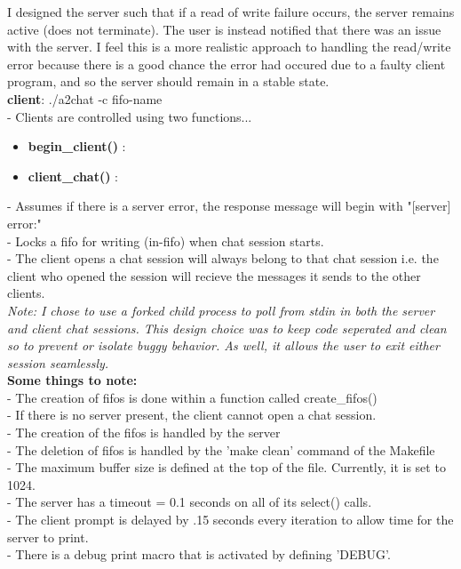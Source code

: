 \documentclass{article}
\begin{document}
\noindent
I designed the server such that if a read of write failure
occurs, the server remains active (does not terminate).
The user is instead notified that there was an issue with
the server. I feel this is a more realistic approach to
handling the read/write error because there is a good
chance the error had occured due to a faulty client
program, and so the server should remain in a stable state. \\

\noindent
\textbf{client}: ./a2chat -c fifo-name \\
- Clients are controlled using two functions...

\begin{itemize}
  \item \textbf{ begin\_client() }:
  \item \textbf{ client\_chat() }:
\end{itemize}

\noindent
- Assumes if there is a server error, the response
message will begin with "[server] error:"\\
- Locks a fifo for writing (in-fifo) when chat session
starts. \\
- The client opens a chat session will always
belong to that chat session i.e. the client
who opened the session will recieve the messages
it sends to the other clients. \\

\noindent
\textit{Note: I chose to use a forked child process to poll
from stdin in both the server and client chat sessions. This
design choice was to keep code seperated and clean so to
prevent or isolate buggy behavior. As well, it allows the
user to exit either session seamlessly.} \\

\noindent
\textbf{ Some things to note: } \\
  - The creation of fifos is done within a function called create\_fifos() \\
  - If there is no server present, the client cannot open a chat session. \\
  - The creation of the fifos is handled by the server \\
  - The deletion of fifos is handled by the 'make clean' command of the Makefile \\
  - The maximum buffer size is defined at the top of the file. Currently, it
    is set to 1024. \\
  - The server has a timeout = 0.1 seconds on all of its select() calls. \\
  - The client prompt is delayed by .15 seconds every iteration to allow
    time for the server to print. \\
  - There is a debug print macro that is activated by defining 'DEBUG'.
\end{document}

